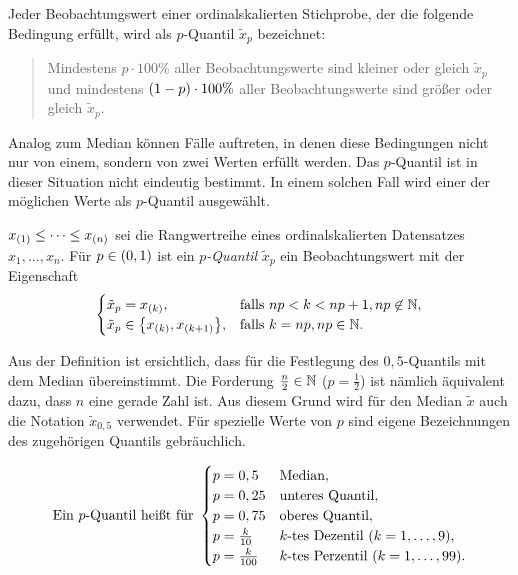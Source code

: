 \documentclass{lecture}
\begin{document}
    Jeder Beobachtungswert einer ordinalskalierten Stichprobe, der die folgende Bedingung erfüllt, wird als \(p\)-Quantil \(\tilde{x}_p\) bezeichnet:
    \begin{quote}
        Mindestens \(p \cdot 100\%\) aller Beobachtungswerte sind kleiner oder gleich \(\tilde{x}_p\) und mindestens \(\parentheses*{1 - p} \cdot 100\%\) aller Beobachtungswerte sind größer oder gleich \(\tilde{x}_p\).
    \end{quote}
    Analog zum Median können Fälle auftreten, in denen diese Bedingungen nicht nur von einem, sondern von zwei Werten erfüllt werden.
    Das \(p\)-Quantil ist in dieser Situation nicht eindeutig bestimmt.
    In einem solchen Fall wird einer der möglichen Werte als \(p\)-Quantil ausgewählt.

    \begin{definition}
        \(x_{\parentheses*{1}} \le \cdots \le x_{\parentheses*{n}}\) sei die Rangwertreihe eines ordinalskalierten Datensatzes \(x_1, \ldots, x_n\).
        Für \(p \in \parentheses*{0, 1}\) ist ein \emph{\(p\)-Quantil} \(\tilde{x}_p\) ein Beobachtungswert mit der Eigenschaft
        \[
            \begin{cases}
                \tilde{x}_p = x_{\parentheses*{k}}, & \text{falls }np < k < np + 1, np \not\in \N,\\
                \tilde{x}_p \in \braces*{x_{\parentheses*{k}}, x_{\parentheses*{k + 1}}}, & \text{falls }k = np, np \in \N.
            \end{cases}
        \]
    \end{definition}

    Aus der Definition ist ersichtlich, dass für die Festlegung des \(0,5\)-Quantils mit dem Median übereinstimmt.
    Die Forderung \(\frac{n}{2} \in \N\) (\(p = \frac{1}{2}\)) ist nämlich äquivalent dazu, dass \(n\) eine gerade Zahl ist.
    Aus diesem Grund wird für den Median \(\tilde{x}\) auch die Notation \(\tilde{x}_{0,5}\) verwendet.
    Für spezielle Werte von \(p\) sind eigene Bezeichnungen des zugehörigen Quantils gebräuchlich.

    \begin{remark}\label{rem:1}
        \[
            \text{Ein }p\text{-Quantil heißt für }\begin{cases}
                p = 0,5 & \text{Median},\\
                p = 0,25 & \text{unteres Quantil},\\
                p = 0,75 & \text{oberes Quantil},\\
                p = \frac{k}{10} & k\text{-tes Dezentil }\parentheses*{k = 1, \ldots, 9},\\
                p = \frac{k}{100} & k\text{-tes Perzentil }\parentheses*{k = 1, \ldots, 99}.
            \end{cases}
        \]
    \end{remark}
\end{document}
